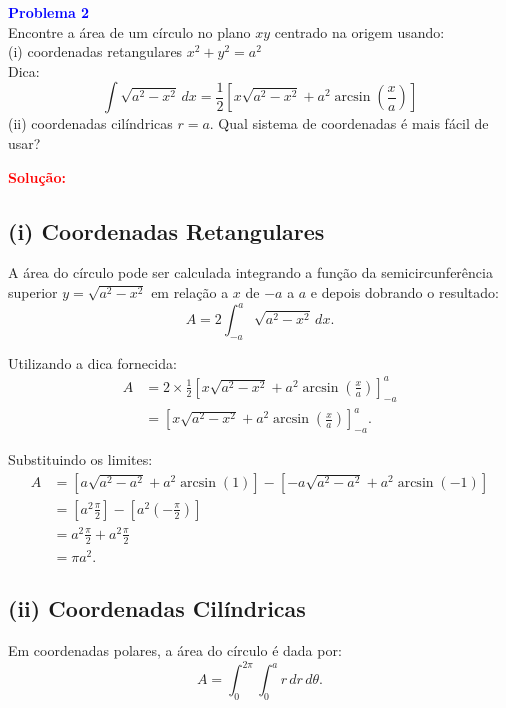 \documentclass[a4paper,12pt]{article}
\begin{document}
\begin{flushleft}
\textbf{\textcolor{blue}{\Large Problema 2}}\\
Encontre a área de um círculo no plano \(xy\) centrado na origem usando: \\ 
(i) coordenadas retangulares \(x^2 + y^2 = a^2 \) \\
Dica:
\begin{equation}
\int \sqrt{a^2 - x^2} \, dx = \frac{1}{2} \left[ x\sqrt{a^2 - x^2} + a^2 \arcsin\left(\frac{x}{a}\right) \right]
\end{equation}
(ii) coordenadas cilíndricas \(r = a\).  
Qual sistema de coordenadas é mais fácil de usar?
\end{flushleft}

\textcolor{red}{\textbf{Solução:}}\\

\subsection*{(i) Coordenadas Retangulares}
A área do círculo pode ser calculada integrando a função da semicircunferência superior $y = \sqrt{a^2 - x^2}$ em relação a $x$ de $-a$ a $a$ e depois dobrando o resultado:
\begin{equation}
A = 2 \int_{-a}^{a} \sqrt{a^2 - x^2} \, dx.
\end{equation}

Utilizando a dica fornecida:
\begin{align*}
A &= 2 \times \frac{1}{2} \left[ x\sqrt{a^2 - x^2} + a^2 \arcsin\left(\frac{x}{a}\right) \right]_{-a}^{a} \\
&= \left[ x\sqrt{a^2 - x^2} + a^2 \arcsin\left(\frac{x}{a}\right) \right]_{-a}^{a}.
\end{align*}

Substituindo os limites:
\begin{align*}
A &= \left[a\sqrt{a^2 - a^2} + a^2 \arcsin(1) \right] - \left[-a\sqrt{a^2 - a^2} + a^2 \arcsin(-1) \right] \\
&= \left[a^2 \frac{\pi}{2} \right] - \left[a^2 \left(-\frac{\pi}{2}\right) \right] \\
&= a^2 \frac{\pi}{2} + a^2 \frac{\pi}{2} \\
&= \pi a^2.
\end{align*}

\subsection*{(ii) Coordenadas Cilíndricas}
Em coordenadas polares, a área do círculo é dada por:
\begin{equation}
A = \int_0^{2\pi} \int_0^a r \, dr \, d\theta.
\end{equation}
\end{document}
